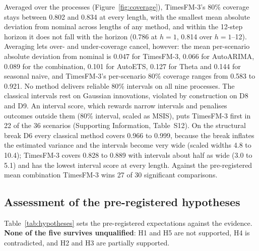 \documentclass[ASNA]{USG}
\providecommand{\tableref}[1]{Table~\ref{#1}}
\providecommand{\figureref}[1]{Figure~\ref{#1}}
\begin{document}
Averaged over the processes (\figureref{fig:coverage}), TimesFM-3's 80\% coverage stays between 0.802 and
0.834 at every length, with the smallest mean absolute deviation from nominal across lengths of any method, and within the
12-step horizon it does not fall with the horizon (0.786 at $h = 1$, 0.814 over $h = 1$--12). Averaging lets
over- and under-coverage cancel, however: the mean per-scenario absolute deviation from nominal is 0.047 for
TimesFM-3, 0.066 for AutoARIMA, 0.089 for the combination, 0.101 for AutoETS, 0.127 for Theta and 0.144 for
seasonal naive, and TimesFM-3's per-scenario 80\% coverage ranges from 0.583 to 0.921. No method delivers
reliable 80\% intervals on all nine processes. The classical intervals rest on Gaussian innovations,
violated by construction on D8 and D9. An interval score, which rewards narrow intervals and penalises
outcomes outside them (80\% interval, scaled as MSIS), puts TimesFM-3 first in 22 of the 36 scenarios
(Supporting Information, Table~S12). On the structural break D6 every classical method covers 0.966 to
0.999, because the break inflates the estimated variance and the intervals become very wide (scaled widths
4.8 to 10.4); TimesFM-3 covers 0.828 to 0.889 with intervals about half as wide (3.0 to 5.1) and has the
lowest interval score at every length. Against the pre-registered mean combination TimesFM-3 wins 27 of 30
significant comparisons.

\subsection{Assessment of the pre-registered hypotheses}
\label{sec:hypotheses}

\tableref{tab:hypotheses} sets the pre-registered expectations against the evidence. \textbf{None of the five
survives unqualified}: H1 and H5 are not supported, H4 is contradicted, and H2 and H3 are partially
supported.
\end{document}
